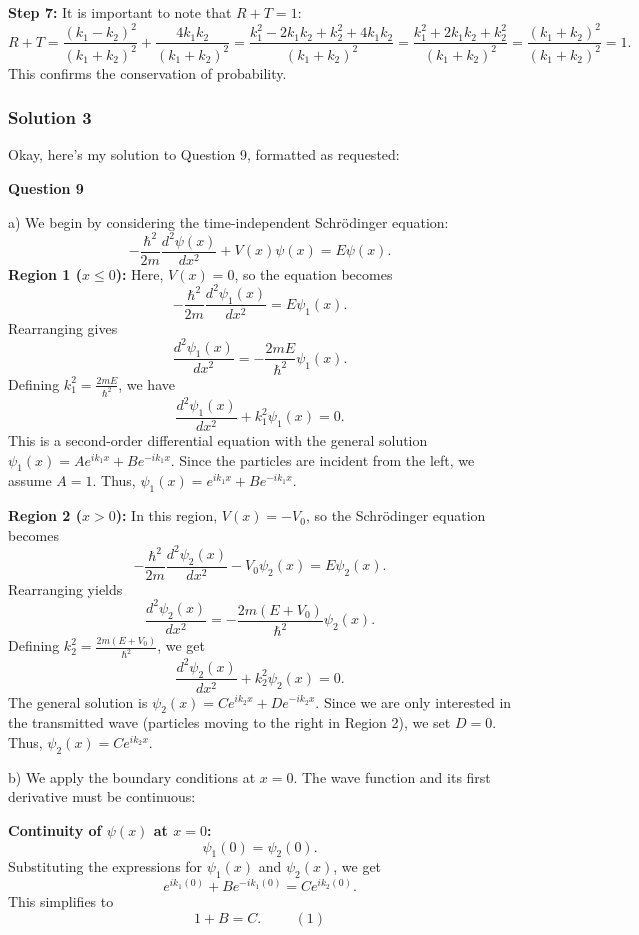 \documentclass{article}
\begin{document}
\textbf{Step 7:} It is important to note that $R + T = 1$:
\[ R + T = \frac{(k_1 - k_2)^2}{(k_1 + k_2)^2} + \frac{4k_1k_2}{(k_1 + k_2)^2} = \frac{k_1^2 - 2k_1k_2 + k_2^2 + 4k_1k_2}{(k_1 + k_2)^2} = \frac{k_1^2 + 2k_1k_2 + k_2^2}{(k_1 + k_2)^2} = \frac{(k_1+k_2)^2}{(k_1+k_2)^2} = 1. \]
This confirms the conservation of probability.


\subsubsection{Solution 3}
Okay, here's my solution to Question 9, formatted as requested:

\noindent \textbf{Question 9}

\noindent a) We begin by considering the time-independent Schrödinger equation:
\[
-\frac{\hbar^2}{2m} \frac{d^2 \psi(x)}{dx^2} + V(x) \psi(x) = E \psi(x).
\]
\noindent \textbf{Region 1 ($x \leq 0$):} Here, $V(x) = 0$, so the equation becomes
\[
-\frac{\hbar^2}{2m} \frac{d^2 \psi_1(x)}{dx^2} = E \psi_1(x).
\]
\noindent Rearranging gives
\[
\frac{d^2 \psi_1(x)}{dx^2} = -\frac{2mE}{\hbar^2} \psi_1(x).
\]
\noindent Defining $k_1^2 = \frac{2mE}{\hbar^2}$, we have
\[
\frac{d^2 \psi_1(x)}{dx^2} + k_1^2 \psi_1(x) = 0.
\]
\noindent This is a second-order differential equation with the general solution $\psi_1(x) = Ae^{ik_1x} + Be^{-ik_1x}$. Since the particles are incident from the left, we assume $A=1$. Thus, $\psi_1(x) = e^{ik_1x} + Be^{-ik_1x}$.

\noindent \textbf{Region 2 ($x > 0$):} In this region, $V(x) = -V_0$, so the Schrödinger equation becomes
\[
-\frac{\hbar^2}{2m} \frac{d^2 \psi_2(x)}{dx^2} - V_0 \psi_2(x) = E \psi_2(x).
\]
\noindent Rearranging yields
\[
\frac{d^2 \psi_2(x)}{dx^2} = -\frac{2m(E + V_0)}{\hbar^2} \psi_2(x).
\]
\noindent Defining $k_2^2 = \frac{2m(E + V_0)}{\hbar^2}$, we get
\[
\frac{d^2 \psi_2(x)}{dx^2} + k_2^2 \psi_2(x) = 0.
\]
\noindent The general solution is $\psi_2(x) = Ce^{ik_2x} + De^{-ik_2x}$. Since we are only interested in the transmitted wave (particles moving to the right in Region 2), we set $D=0$. Thus, $\psi_2(x) = Ce^{ik_2x}$.

\noindent b) We apply the boundary conditions at $x = 0$. The wave function and its first derivative must be continuous:

\noindent \textbf{Continuity of $\psi(x)$ at $x=0$:}
\[
\psi_1(0) = \psi_2(0).
\]
\noindent Substituting the expressions for $\psi_1(x)$ and $\psi_2(x)$, we get
\[
e^{ik_1(0)} + Be^{-ik_1(0)} = Ce^{ik_2(0)}.
\]
\noindent This simplifies to
\[
1 + B = C. \hspace{1cm} (1)
\]
\end{document}
